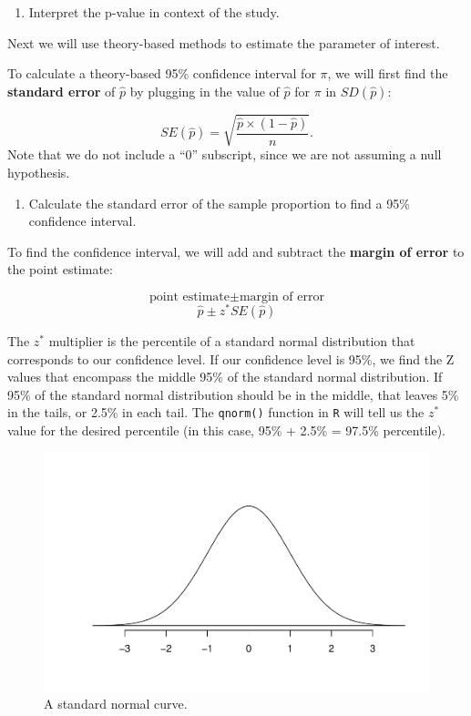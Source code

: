 \documentclass[
]{report}
\providecommand{\tightlist}{%
  \setlength{\itemsep}{0pt}\setlength{\parskip}{0pt}}
\begin{document}
\begin{enumerate}
\def\labelenumi{\arabic{enumi}.}
\setcounter{enumi}{9}
\tightlist
\item
  Interpret the p-value in context of the study.
\end{enumerate}

\vspace{0.8in}

Next we will use theory-based methods to estimate the parameter of interest.

To calculate a theory-based 95\% confidence interval for \(\pi\), we will first find the \textbf{standard error} of \(\hat{p}\) by plugging in the value of \(\hat{p}\) for \(\pi\) in \(SD(\hat{p})\):

\[SE(\hat{p}) = \sqrt{\frac{\hat{p}\times(1-\hat{p})}{n}}.\]
Note that we do not include a ``0'' subscript, since we are not assuming a null hypothesis.

\begin{enumerate}
\def\labelenumi{\arabic{enumi}.}
\setcounter{enumi}{10}
\tightlist
\item
  Calculate the standard error of the sample proportion to find a 95\% confidence interval.
\end{enumerate}

\vspace{0.5in}

To find the confidence interval, we will add and subtract the \textbf{margin of error} to the point estimate:

\[\text{point estimate}\pm\text{margin of error}\]
\[\hat{p}\pm z^* SE(\hat{p})\]

The \(z^*\) multiplier is the percentile of a standard normal distribution that corresponds to our confidence level. If our confidence level is 95\%, we find the Z values that encompass the middle 95\% of the standard normal distribution. If 95\% of the standard normal distribution should be in the middle, that leaves 5\% in the tails, or 2.5\% in each tail. The \texttt{qnorm()} function in \texttt{R} will tell us the \(z^*\) value for the desired percentile (in this case, 95\% + 2.5\% = 97.5\% percentile).

\begin{figure}

{\centering \includegraphics[width=0.5\linewidth]{05-UR-module4_review_files/figure-latex/Ncurve-1} 

}

\caption{A standard normal curve.}\label{fig:Ncurve}
\end{figure}
\end{document}
